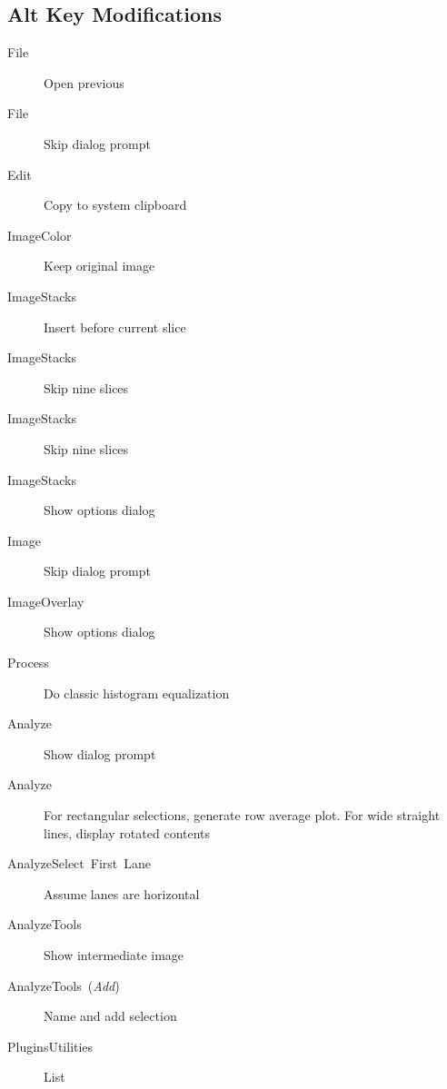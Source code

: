 \subsection{Alt Key Modifications}
\begin{description}
\item [{\textsf{File\lyxarrow{}}}] Open previous
\item [{\textsf{File\lyxarrow{}}}] Skip dialog
prompt
\item [{\textsf{Edit\lyxarrow{}}}] Copy to system
clipboard
\item [{\textsf{Image\lyxarrow{}Color\lyxarrow{}}}] Keep
original image
\item [{\textsf{Image\lyxarrow{}Stacks\lyxarrow{}}}] Insert
before current slice 
\item [{\textsf{Image\lyxarrow{}Stacks\lyxarrow{}}}] Skip
nine slices 
\item [{\textsf{Image\lyxarrow{}Stacks\lyxarrow{}}}] Skip
nine slices 
\item [{\textsf{Image\lyxarrow{}Stacks\lyxarrow{}}}] Show
options dialog
\item [{\textsf{Image\lyxarrow{}}}] Skip
dialog prompt
\item [{\textsf{Image\lyxarrow{}Overlay\lyxarrow{}}}] Show
options dialog
\item [{\textsf{Process\lyxarrow{}}}] Do
classic histogram equalization
\item [{\textsf{Analyze\lyxarrow{}}}] Show dialog
prompt
\item [{\textsf{Analyze\lyxarrow{}}}] For
rectangular selections, generate row average plot. For wide straight
lines, display rotated contents 
\item [{\textsf{Analyze\lyxarrow{}Select\ First\ Lane}}] Assume
lanes are horizontal
\item [{\textsf{Analyze\lyxarrow{}Tools\lyxarrow{}}}] Show
intermediate image 
\item [{\textsf{Analyze\lyxarrow{}Tools\lyxarrow{}\ (}\textsf{\emph{Add}}\textsf{)}}] Name
and add selection 
\item [{\textsf{Plugins\lyxarrow{}Utilities\lyxarrow{}}}] List

\end{description}
